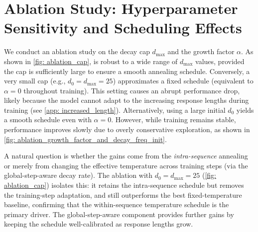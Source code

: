 \newpage
\section{Ablation Study: Hyperparameter Sensitivity and Scheduling Effects}
\label{app:ablation_details}

We conduct an ablation study on the decay cap $d_{\max}$ and the growth factor $\alpha$. As shown in \cref{fig: ablation_cap}, \alg is robust to a wide range of $d_{\max}$ values, provided the cap is sufficiently large to ensure a smooth annealing schedule. Conversely, a very small cap (e.g., $d_0=d_{\max}=25$) approximates a fixed schedule (equivalent to $\alpha=0$ throughout training). This setting causes an abrupt performance drop, likely because the model cannot adapt to the increasing response lengths during training (see \cref{app: increased_length}). Alternatively, using a large initial $d_0$ yields a smooth schedule even with $\alpha=0$. However, while training remains stable, performance improves slowly due to overly conservative exploration, as shown in \cref{fig: ablation_growth_factor_and_decay_freq_init}.

A natural question is whether the gains come from the \emph{intra-sequence} annealing or merely from changing the effective temperature across training steps (via the global-step-aware decay rate). The ablation with $d_0 = d_{\max} = 25$ (\cref{fig: ablation_cap}) isolates this: it retains the intra-sequence schedule but removes the training-step adaptation, and still outperforms the best fixed-temperature baseline, confirming that the within-sequence temperature schedule is the primary driver. The global-step-aware component provides further gains by keeping the schedule well-calibrated as response lengths grow.

